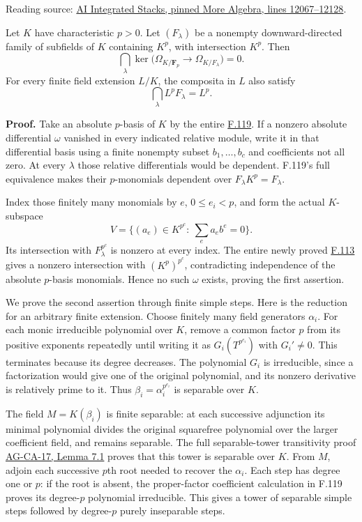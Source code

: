 \documentclass[11pt,a4paper,openany]{report}
\newcounter{none}
\begin{document}
Reading source: \href{https://github.com/KokunoYumeto/unofficial-stacks-project-ai-drafts/blob/565b10e987aba5969b21145a0833f42d69f96790/more-algebra.tex\#L12067-L12128}{AI Integrated Stacks, pinned More Algebra, lines 12067--12128}.

Let \(K\) have characteristic \(p>0\). Let \((F_\lambda)\) be a nonempty downward-directed family of subfields of \(K\) containing \(K^p\), with intersection \(K^p\). Then \[
\bigcap_\lambda\ker\bigl(\Omega_{K/\mathbf F_p}\to\Omega_{K/F_\lambda}\bigr)=0.
\] For every finite field extension \(L/K\), the composita in \(L\) also satisfy \[\bigcap_\lambda L^pF_\lambda=L^p.\]

\textbf{Proof.} Take an absolute \(p\)-basis of \(K\) by the entire \hyperref[AG-RG-S05-more-algebra-lemma-p-basis]{F.119}. If a nonzero absolute differential \(\omega\) vanished in every indicated relative module, write it in that differential basis using a finite nonempty subset \(b_1,\ldots,b_c\) and coefficients not all zero. At every \(\lambda\) those relative differentials would be dependent. F.119's full equivalence makes their \(p\)-monomials dependent over \(F_\lambda K^p=F_\lambda\).

Index those finitely many monomials by \(e\), \(0\le e_i<p\), and form the actual \(K\)-subspace \[V=\{(a_e)\in K^{p^c}:\ \sum_e a_e b^e=0\}.\] Its intersection with \(F_\lambda^{p^c}\) is nonzero at every index. The entire newly proved \hyperref[AG-RG-S05-more-algebra-lemma-intersection-subfields-subspace]{F.113} gives a nonzero intersection with \((K^p)^{p^c}\), contradicting independence of the absolute \(p\)-basis monomials. Hence no such \(\omega\) exists, proving the first assertion.

We prove the second assertion through finite simple steps. Here is the reduction for an arbitrary finite extension. Choose finitely many field generators \(\alpha_i\). For each monic irreducible polynomial over \(K\), remove a common factor \(p\) from its positive exponents repeatedly until writing it as \(G_i(T^{p^{e_i}})\) with \(G_i'\ne0\). This terminates because its degree decreases. The polynomial \(G_i\) is irreducible, since a factorization would give one of the original polynomial, and its nonzero derivative is relatively prime to it. Thus \(\beta_i=\alpha_i^{p^{e_i}}\) is separable over \(K\).

The field \(M=K(\beta_i)\) is finite separable: at each successive adjunction its minimal polynomial divides the original squarefree polynomial over the larger coefficient field, and remains separable. The full separable-tower transitivity proof \href{https://github.com/KokunoYumeto/open-math-courses/blob/d02d0a3669f42579db037cd44de1d113fdd770a1/docs/courses/AG-CA/src/formally-smooth-unramified-and-etale-ring-maps.md}{AG-CA-17, Lemma 7.1} proves that this tower is separable over \(K\). From \(M\), adjoin each successive \(p\)th root needed to recover the \(\alpha_i\). Each step has degree one or \(p\): if the root is absent, the proper-factor coefficient calculation in F.119 proves its degree-\(p\) polynomial irreducible. This gives a tower of separable simple steps followed by degree-\(p\) purely inseparable steps.
\end{document}
